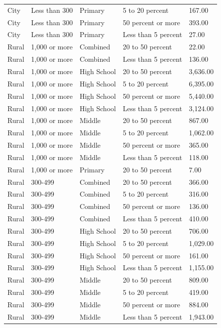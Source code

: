\documentclass[man]{apa6}
\begin{document}
\begin{table}[tbp]
\begin{center}
\begin{threeparttable}
\begin{tabular}{lllll}
City & Less than 300 & Primary & 5 to 20 percent & 167.00\\
City & Less than 300 & Primary & 50 percent or more & 393.00\\
City & Less than 300 & Primary & Less than 5 percent & 27.00\\
Rural & 1,000 or more & Combined & 20 to 50 percent & 22.00\\
Rural & 1,000 or more & Combined & Less than 5 percent & 136.00\\
Rural & 1,000 or more & High School & 20 to 50 percent & 3,636.00\\
Rural & 1,000 or more & High School & 5 to 20 percent & 6,395.00\\
Rural & 1,000 or more & High School & 50 percent or more & 5,440.00\\
Rural & 1,000 or more & High School & Less than 5 percent & 3,124.00\\
Rural & 1,000 or more & Middle & 20 to 50 percent & 867.00\\
Rural & 1,000 or more & Middle & 5 to 20 percent & 1,062.00\\
Rural & 1,000 or more & Middle & 50 percent or more & 365.00\\
Rural & 1,000 or more & Middle & Less than 5 percent & 118.00\\
Rural & 1,000 or more & Primary & 20 to 50 percent & 7.00\\
Rural & 300-499 & Combined & 20 to 50 percent & 366.00\\
Rural & 300-499 & Combined & 5 to 20 percent & 316.00\\
Rural & 300-499 & Combined & 50 percent or more & 136.00\\
Rural & 300-499 & Combined & Less than 5 percent & 410.00\\
Rural & 300-499 & High School & 20 to 50 percent & 706.00\\
Rural & 300-499 & High School & 5 to 20 percent & 1,029.00\\
Rural & 300-499 & High School & 50 percent or more & 161.00\\
Rural & 300-499 & High School & Less than 5 percent & 1,155.00\\
Rural & 300-499 & Middle & 20 to 50 percent & 809.00\\
Rural & 300-499 & Middle & 5 to 20 percent & 419.00\\
Rural & 300-499 & Middle & 50 percent or more & 884.00\\
Rural & 300-499 & Middle & Less than 5 percent & 1,943.00\\

\end{tabular}
\end{threeparttable}
\end{center}
\end{table}
\end{document}
